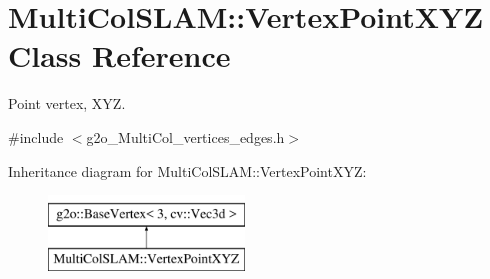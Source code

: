 \hypertarget{classMultiColSLAM_1_1VertexPointXYZ}{}\section{Multi\+Col\+S\+L\+AM\+:\+:Vertex\+Point\+X\+YZ Class Reference}
\label{classMultiColSLAM_1_1VertexPointXYZ}


Point vertex, X\+YZ.  




{\ttfamily \#include $<$g2o\+\_\+\+Multi\+Col\+\_\+vertices\+\_\+edges.\+h$>$}

Inheritance diagram for Multi\+Col\+S\+L\+AM\+:\+:Vertex\+Point\+X\+YZ\+:\begin{figure}[H]
\begin{center}
\leavevmode
\includegraphics[height=2.000000cm]{classMultiColSLAM_1_1VertexPointXYZ}
\end{center}
\end{figure}
